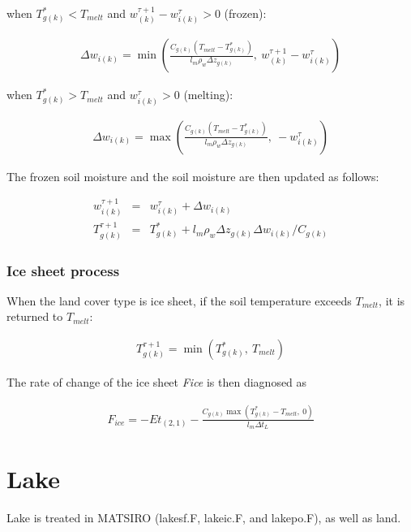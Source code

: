 when \(T_{g(k)}^\ast<T_{melt}\) and \(w_{(k)}^{\tau+1}-w_{i(k)}^{\tau}>0\) (frozen):

\begin{eqnarray}
\Delta w_{i(k)} = \min\left(
\frac{C_{g(k)}(T_{melt}-T_{g(k)}^\ast)}{l_m \rho_w \Delta z_{g(k)}}, \
w_{(k)}^{\tau+1}-w_{i(k)}^{\tau}
\right)
\end{eqnarray}

when \(T_{g(k)}^\ast>T_{melt}\) and \(w_{i(k)}^{\tau}>0\) (melting):

\begin{eqnarray}
\Delta w_{i(k)} = \max\left(
\frac{C_{g(k)}(T_{melt}-T_{g(k)}^\ast)}{l_m \rho_w \Delta z_{g(k)}}, \
-w_{i(k)}^{\tau}
\right)
\end{eqnarray}

The frozen soil moisture and the soil moisture are then updated as follows:

\begin{eqnarray}
w_{i(k)}^{\tau+1} &=& w_{i(k)}^{\tau} + \Delta w_{i(k)} \\
T_{g(k)}^{\tau+1} &=& T_{g(k)}^\ast + l_m \rho_w \Delta z_{g(k)} \Delta w_{i(k)} / C_{g(k)}
\end{eqnarray}

\subsubsection{Ice sheet process}\label{ice-sheet-process}

When the land cover type is ice sheet, if the soil temperature exceeds \(T_{melt}\), it is returned to \(T_{melt}\):

\begin{eqnarray}
 T_{g(k)}^{\tau+1} = \min( T_{g(k)}^\ast, \ T_{melt} )
\end{eqnarray}

The rate of change of the ice sheet \emph{Fice} is then diagnosed as

\begin{eqnarray}
 F_{ice} = - Et_{(2,1)} - \frac{C_{g(k)}\max(T_{g(k)}^\ast - T_{melt},\ 0)}{l_m \Delta t_L}
\end{eqnarray}

\section{Lake}\label{lake}

Lake is treated in MATSIRO (lakesf.F, lakeic.F, and lakepo.F), as well as land.

